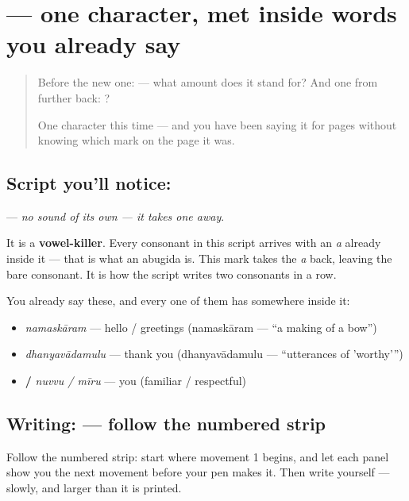 \section[\texorpdfstring{\te{్} (virama)}{్ (virama)}]{ — one character, met inside words you already say}

\label{lesson:TE-S05-sign-virama}



\begin{quote}
Before the new one:  — what amount does it stand for? And one from further back: ?

One character this time — and you have been saying it for pages without knowing which mark on the page it was.
\end{quote}

\subsection*{Script you'll notice: }
\textbf{} — \emph{no sound of its own — it takes one away}.

It is a \textbf{vowel-killer}. Every consonant in this script arrives with an \emph{a} already inside it — that is what an abugida is. This mark takes the \emph{a} back, leaving the bare consonant. It is how the script writes two consonants in a row.

You already say these, and every one of them has  somewhere inside it:

\begin{itemize}
\raggedright
  \item \textbf{} \emph{namaskāram} — hello / greetings (namaskāram — \textquotedblleft{}a making of a bow\textquotedblright{})
  \item \textbf{} \emph{dhanyavādamulu} — thank you (dhanyavādamulu — \textquotedblleft{}utterances of 'worthy'\textquotedblright{})
  \item \textbf{ / } \emph{nuvvu / mīru} — you (familiar / respectful)
\end{itemize}

\subsection*{Writing:  — follow the numbered strip}

Follow the numbered strip: start where movement 1 begins, and let each panel show you the next movement before your pen makes it. Then write  yourself — slowly, and larger than it is printed.

